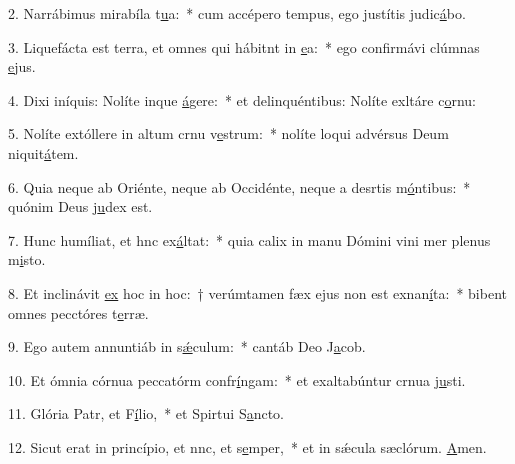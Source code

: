 2. Narrábimus mirabíla t\uline{u}a:~* cum accépero tempus, ego justítis judic\uline{á}bo.\par 
3. Liquefácta est terra, et omnes qui hábitnt in \uline{e}a:~* ego confirmávi clúmnas \uline{e}jus.\par 
4. Dixi iníquis: Nolíte inque \uline{á}gere:~* et delinquéntibus: Nolíte exltáre c\uline{o}rnu:\par 
5. Nolíte extóllere in altum crnu v\uline{e}strum:~* nolíte loqui advérsus Deum niquit\uline{á}tem.\par 
6. Quia neque ab Oriénte, neque ab Occidénte, neque a desrtis m\uline{ó}ntibus:~* quónim Deus j\uline{u}dex est.\par 
7. Hunc humíliat, et hnc ex\uline{á}ltat:~* quia calix in manu Dómini vini mer plenus m\uline{i}sto.\par 
8. Et inclinávit \uline{ex} hoc in hoc:~† verúmtamen fæx ejus non est exnan\uline{í}ta:~* bibent omnes pecctóres t\uline{e}rræ.\par 
9. Ego autem annuntiáb in s\uline{ǽ}culum:~* cantáb Deo J\uline{a}cob.\par 
10. Et ómnia córnua peccatórm confr\uline{í}ngam:~* et exaltabúntur crnua j\uline{u}sti.\par 
11. Glória Patr, et F\uline{í}lio,~* et Spirtui S\uline{a}ncto.\par 
12. Sicut erat in princípio, et nnc, et s\uline{e}mper,~* et in sǽcula sæclórum. \uline{A}men.\par 
